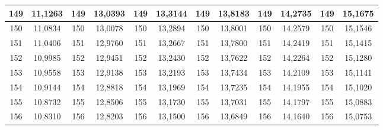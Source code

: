 \documentclass[a4paper,12pt]{article} %
\begin{document}
\begin{longtable}[c]{cccccccccc|c|c|}
	\multicolumn{1}{|c|}{149} & \multicolumn{1}{c|}{11,1263} & \multicolumn{1}{c|}{149} & \multicolumn{1}{c|}{13,0393} & \multicolumn{1}{c|}{149} & \multicolumn{1}{c|}{13,3144} & \multicolumn{1}{c|}{149} & \multicolumn{1}{c|}{13,8183} & \multicolumn{1}{c|}{149} & 14,2735 & 149 & 15,1675 \\ \hline
	\multicolumn{1}{|c|}{150} & \multicolumn{1}{c|}{11,0834} & \multicolumn{1}{c|}{150} & \multicolumn{1}{c|}{13,0078} & \multicolumn{1}{c|}{150} & \multicolumn{1}{c|}{13,2894} & \multicolumn{1}{c|}{150} & \multicolumn{1}{c|}{13,8001} & \multicolumn{1}{c|}{150} & 14,2579 & 150 & 15,1546 \\ \hline
	\multicolumn{1}{|c|}{151} & \multicolumn{1}{c|}{11,0406} & \multicolumn{1}{c|}{151} & \multicolumn{1}{c|}{12,9760} & \multicolumn{1}{c|}{151} & \multicolumn{1}{c|}{13,2667} & \multicolumn{1}{c|}{151} & \multicolumn{1}{c|}{13,7800} & \multicolumn{1}{c|}{151} & 14,2419 & 151 & 15,1415 \\ \hline
	\multicolumn{1}{|c|}{152} & \multicolumn{1}{c|}{10,9985} & \multicolumn{1}{c|}{152} & \multicolumn{1}{c|}{12,9451} & \multicolumn{1}{c|}{152} & \multicolumn{1}{c|}{13,2430} & \multicolumn{1}{c|}{152} & \multicolumn{1}{c|}{13,7622} & \multicolumn{1}{c|}{152} & 14,2264 & 152 & 15,1280 \\ \hline
	\multicolumn{1}{|c|}{153} & \multicolumn{1}{c|}{10,9558} & \multicolumn{1}{c|}{153} & \multicolumn{1}{c|}{12,9138} & \multicolumn{1}{c|}{153} & \multicolumn{1}{c|}{13,2193} & \multicolumn{1}{c|}{153} & \multicolumn{1}{c|}{13,7434} & \multicolumn{1}{c|}{153} & 14,2109 & 153 & 15,1141 \\ \hline
	\multicolumn{1}{|c|}{154} & \multicolumn{1}{c|}{10,9144} & \multicolumn{1}{c|}{154} & \multicolumn{1}{c|}{12,8818} & \multicolumn{1}{c|}{154} & \multicolumn{1}{c|}{13,1969} & \multicolumn{1}{c|}{154} & \multicolumn{1}{c|}{13,7235} & \multicolumn{1}{c|}{154} & 14,1955 & 154 & 15,1020 \\ \hline
	\multicolumn{1}{|c|}{155} & \multicolumn{1}{c|}{10,8732} & \multicolumn{1}{c|}{155} & \multicolumn{1}{c|}{12,8506} & \multicolumn{1}{c|}{155} & \multicolumn{1}{c|}{13,1730} & \multicolumn{1}{c|}{155} & \multicolumn{1}{c|}{13,7031} & \multicolumn{1}{c|}{155} & 14,1797 & 155 & 15,0883 \\ \hline
	\multicolumn{1}{|c|}{156} & \multicolumn{1}{c|}{10,8310} & \multicolumn{1}{c|}{156} & \multicolumn{1}{c|}{12,8203} & \multicolumn{1}{c|}{156} & \multicolumn{1}{c|}{13,1500} & \multicolumn{1}{c|}{156} & \multicolumn{1}{c|}{13,6849} & \multicolumn{1}{c|}{156} & 14,1640 & 156 & 15,0753 \\ \hline

\end{longtable}
\end{document}
